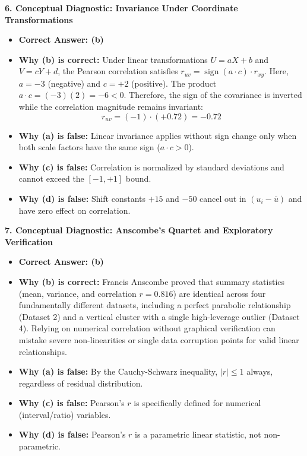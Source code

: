 \textbf{6. Conceptual Diagnostic: Invariance Under Coordinate Transformations}
\begin{itemize}
    \item \textbf{Correct Answer: (b)}
    \item \textbf{Why (b) is correct:} Under linear transformations $U = aX + b$ and $V = cY + d$, the Pearson correlation satisfies $r_{uv} = \operatorname{sign}(a \cdot c) \cdot r_{xy}$. Here, $a = -3$ (negative) and $c = +2$ (positive). The product $a \cdot c = (-3)(2) = -6 < 0$. Therefore, the sign of the covariance is inverted while the correlation magnitude remains invariant:
    $$r_{uv} = (-1) \cdot (+0.72) = \mathbf{-0.72}$$
    \item \textbf{Why (a) is false:} Linear invariance applies without sign change only when both scale factors have the same sign ($a \cdot c > 0$).
    \item \textbf{Why (c) is false:} Correlation is normalized by standard deviations and cannot exceed the $[-1, +1]$ bound.
    \item \textbf{Why (d) is false:} Shift constants $+15$ and $-50$ cancel out in $(u_i - \bar{u})$ and have zero effect on correlation.
\end{itemize}

\textbf{7. Conceptual Diagnostic: Anscombe's Quartet and Exploratory Verification}
\begin{itemize}
    \item \textbf{Correct Answer: (b)}
    \item \textbf{Why (b) is correct:} Francis Anscombe proved that summary statistics (mean, variance, and correlation $r = 0.816$) are identical across four fundamentally different datasets, including a perfect parabolic relationship (Dataset 2) and a vertical cluster with a single high-leverage outlier (Dataset 4). Relying on numerical correlation without graphical verification can mistake severe non-linearities or single data corruption points for valid linear relationships.
    \item \textbf{Why (a) is false:} By the Cauchy-Schwarz inequality, $|r| \le 1$ always, regardless of residual distribution.
    \item \textbf{Why (c) is false:} Pearson's $r$ is specifically defined for numerical (interval/ratio) variables.
    \item \textbf{Why (d) is false:} Pearson's $r$ is a parametric linear statistic, not non-parametric.
\end{itemize}


